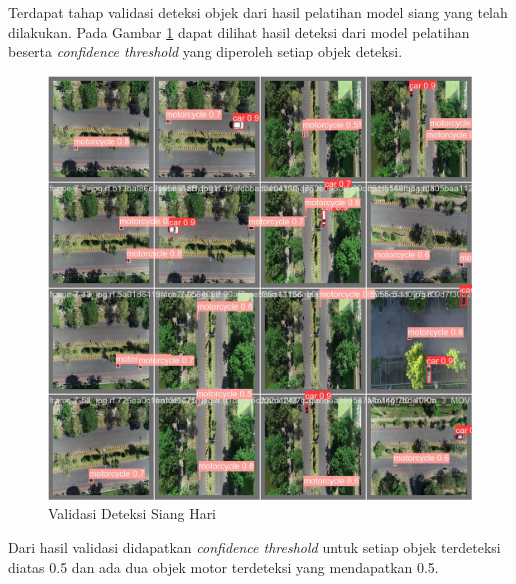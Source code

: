 Terdapat tahap validasi deteksi objek dari hasil pelatihan model siang yang telah dilakukan. Pada Gambar \ref{fig:validasi deteksi siang} dapat dilihat hasil deteksi dari model pelatihan beserta \emph{confidence threshold} yang diperoleh setiap objek deteksi.
\vspace{-3pt}
\begin{figure} [H] \centering
  \includegraphics[scale=0.25]{bab4/val_batch_siang.jpg}
  \caption{Validasi Deteksi Siang Hari}
  \label{fig:validasi deteksi siang}
\end{figure}
\vspace{-3pt}
Dari hasil validasi didapatkan \emph{confidence threshold} untuk setiap objek terdeteksi diatas 0.5 dan ada dua objek motor terdeteksi yang mendapatkan 0.5.

